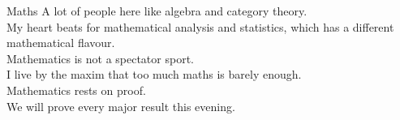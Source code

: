 \documentclass{beamer}
\begin{document}
\begin{frame}{Maths}
A lot of people here like algebra and category theory. \\
My heart beats for mathematical analysis and statistics, which has a different mathematical flavour. \\
Mathematics is not a spectator sport. \\
I live by the maxim that too much maths is barely enough. \\
Mathematics rests on proof. \\
We will prove every major result this evening. \\
\end{frame}







\end{document}
